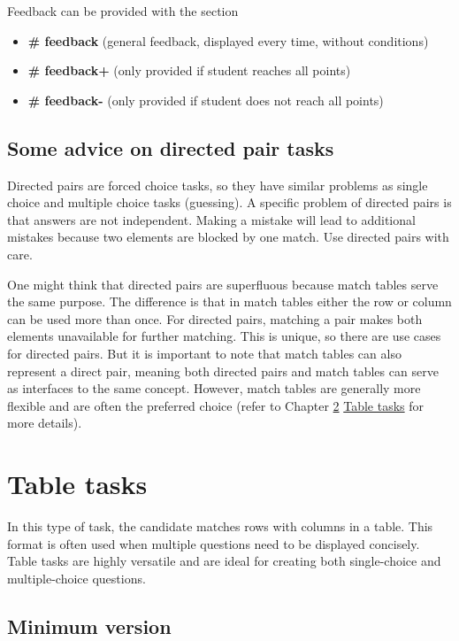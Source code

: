 \documentclass[twoside]{tufte-book}
\providecommand{\tightlist}{%
  \setlength{\itemsep}{0pt}\setlength{\parskip}{0pt}}
\begin{document}
Feedback can be provided with the section

\begin{itemize}
\tightlist
\item
  \textbf{\# feedback} (general feedback, displayed every time, without conditions)
\item
  \textbf{\# feedback+} (only provided if student reaches all points)
\item
  \textbf{\# feedback-} (only provided if student does not reach all points)
\end{itemize}

\section{Some advice on directed pair tasks}\label{some-advice-on-directed-pair-tasks}

Directed pairs are forced choice tasks, so they have similar problems as single choice and multiple choice tasks (guessing). A specific problem of directed pairs is that answers are not independent. Making a mistake will lead to additional mistakes because two elements are blocked by one match. Use directed pairs with care.

One might think that directed pairs are superfluous because match tables serve the same purpose. The difference is that in match tables either the row or column can be used more than once. For directed pairs, matching a pair makes both elements unavailable for further matching. This is unique, so there are use cases for directed pairs. But it is important to note that match tables can also represent a direct pair, meaning both directed pairs and match tables can serve as interfaces to the same concept. However, match tables are generally more flexible and are often the preferred choice (refer to Chapter \ref{table-tasks} \href{table.html}{Table tasks} for more details).

\chapter{Table tasks}\label{table-tasks}

In this type of task, the candidate matches rows with columns in a table. This format is often used when multiple questions need to be displayed concisely. Table tasks are highly versatile and are ideal for creating both single-choice and multiple-choice questions.

\section{Minimum version}\label{minimum-version-7}
\end{document}
